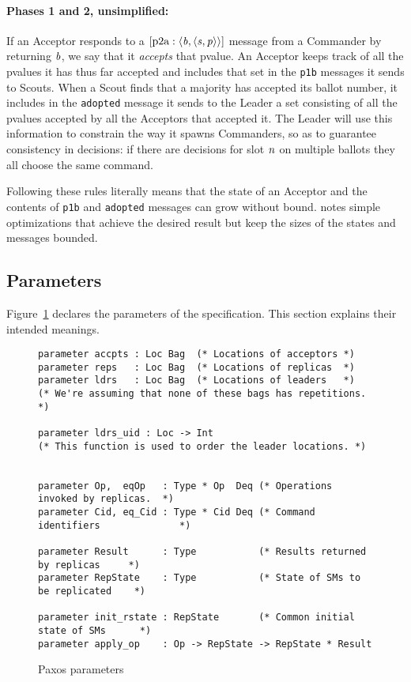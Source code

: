 \documentclass[final]{article}
\newcommand{\listinline}[1]{\text{\lstinline{#1}}}
\newcommand{\bsp}{\mbox{$\NUPRLpair{\NUPRL{b}}{\NUPRLpair{\NUPRL{s}}{\NUPRL{p}}}$}}
\newcommand{\msg}[2]{\ensuremath{[\listinline{#1}:\NUPRL{#2}]}}
\begin{document}
\paragraph{Phases 1 and 2, unsimplified:}

If an Acceptor responds to a
\msg{p2a}{\bsp} message from a
Commander by returning $\mathit{b}$, we say that it \emph{accepts} that
pvalue.  An Acceptor keeps track of all the pvalues it has thus far
accepted and includes that set in the \lstinline{p1b} messages it
sends to Scouts.  When a Scout finds that a majority has accepted its
ballot number, it includes in the \lstinline{adopted} message it
sends to the Leader a set consisting of all the pvalues accepted by
all the Acceptors that accepted it.  The Leader will use this
information to constrain the way it spawns Commanders, so as to
guarantee consistency in decisions: if there are decisions for slot
$\mathit{n}$ on multiple ballots they all choose the same command.

\vspace{1.0ex} Following these rules literally means that the state of
an Acceptor and the contents of \lstinline{p1b} and
\lstinline{adopted} messages can grow without bound.
\cite{VanRenesse:2011} notes simple optimizations that achieve the
desired result but keep the sizes of the states and messages bounded.

\subsection{Parameters}

Figure~\ref{fig:Paxos-parameters} declares the parameters of the
specification.  This section explains their intended meanings.

\begin{figure}%
  \begin{lstlisting}[basicstyle=\small]
parameter accpts : Loc Bag  (* Locations of acceptors *)
parameter reps   : Loc Bag  (* Locations of replicas  *)
parameter ldrs   : Loc Bag  (* Locations of leaders   *)
(* We're assuming that none of these bags has repetitions. *)

parameter ldrs_uid : Loc -> Int
(* This function is used to order the leader locations. *)


parameter Op,  eqOp   : Type * Op  Deq (* Operations invoked by replicas.  *)
parameter Cid, eq_Cid : Type * Cid Deq (* Command identifiers              *)

parameter Result      : Type           (* Results returned by replicas     *)
parameter RepState    : Type           (* State of SMs to be replicated    *)

parameter init_rstate : RepState       (* Common initial state of SMs      *)
parameter apply_op    : Op -> RepState -> RepState * Result
  \end{lstlisting}
  \caption{Paxos parameters}
  \label{fig:Paxos-parameters}
\end{figure}
\end{document}
